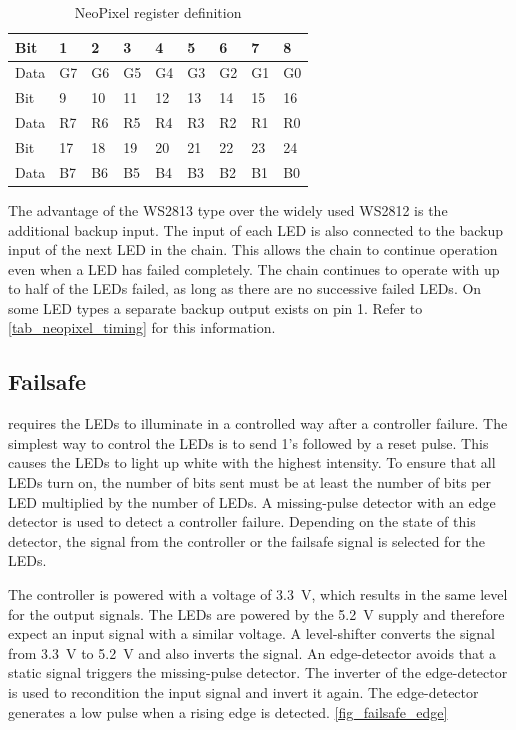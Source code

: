 \begin{table}[h!]
    \centering
    \begin{tabular}{|l|l|l|l|l|l|l|l|l|}
        \hline
        Bit     & 1  & 2  & 3  & 4  & 5  & 6  & 7  & 8  \\
        \hline
        Data    & G7 & G6 & G5 & G4 & G3 & G2 & G1 & G0 \\
        \hline
        \hline
        Bit     & 9  & 10 & 11 & 12 & 13 & 14 & 15 & 16 \\
        \hline
        Data    & R7 & R6 & R5 & R4 & R3 & R2 & R1 & R0 \\
        \hline
        \hline
        Bit     & 17 & 18 & 19 & 20 & 21 & 22 & 23 & 24 \\
        \hline
        Data    & B7 & B6 & B5 & B4 & B3 & B2 & B1 & B0 \\ 
        \hline
    \end{tabular}
    \caption{NeoPixel register definition}
    \label{tab_neopixel_register}
\end{table}

The advantage of the WS2813 type over the widely used WS2812 is the additional backup input. The input of each \ac{LED} is also connected to the backup input of the next \ac{LED} in the chain. This allows the chain to continue operation even when a \ac{LED} has failed completely. The chain continues to operate with up to half of the \acp{LED} failed, as long as there are no successive failed \acp{LED}. On some \ac{LED} types a separate backup output exists on pin 1. Refer to \autoref{tab_neopixel_timing} for this information. 

\subsection{Failsafe}
\label{sec_failsafe}
 requires the \acp{LED} to illuminate in a controlled way after a controller failure. The simplest way to control the \acp{LED} is to send 1's followed by a reset pulse. This causes the \acp{LED} to light up white with the highest intensity. To ensure that all \acp{LED} turn on, the number of bits sent must be at least the number of bits per \ac{LED} multiplied by the number of \acp{LED}. A missing-pulse detector with an edge detector is used to detect a controller failure. Depending on the state of this detector, the signal from the controller or the failsafe signal is selected for the \acp{LED}. 

The controller is powered with a voltage of \qty{3.3}{\volt}, which results in the same level for the output signals. The \acp{LED} are powered by the \qty{5.2}{\volt} supply and therefore expect an input signal with a similar voltage. A level-shifter converts the signal from \qty{3.3}{\volt} to \qty{5.2}{\volt} and also inverts the signal. An edge-detector avoids that a static signal triggers the missing-pulse detector. The inverter of the edge-detector is used to recondition the input signal and invert it again. The edge-detector generates a low pulse when a rising edge is detected. \autoref{fig_failsafe_edge}

